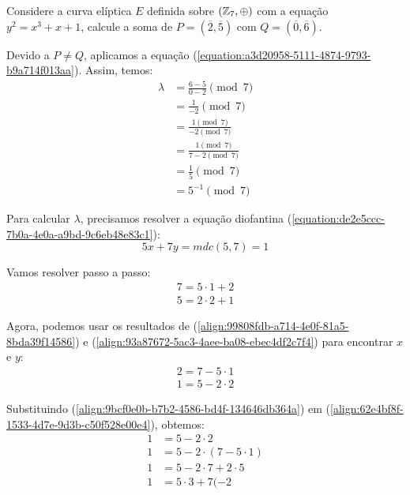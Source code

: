 \begin{exemplo} \label{exemplo:b4a1c70a-c453-4fa1-96dd-06ef10d1fc29}

	Considere a curva elíptica $E$ definida sobre $(\mathbb{Z}_7, \oplus)$ com a equação
	$y^2 = x^3 + x + 1$, calcule a soma de $P = (\overline{2}, \overline{5})$ com
	$Q = (\overline{0}, \overline{6})$.

	Devido a $P \neq Q$, aplicamos a equação
	(\ref{equation:a3d20958-5111-4874-9793-b9a714f013aa}). Assim, temos:
	\begin{align}
		\lambda & = \frac{6 - 5}{0 - 2} \pmod{7} \nonumber                              \\
		        & = \frac{1}{-2} \pmod{7} \nonumber                                     \\
		        & = \frac{1 \pmod{7}}{-2 \pmod{7}} \nonumber                            \\
		        & = \frac{1 \pmod{7}}{7 - 2 \pmod{7}} \nonumber                         \\
		        & = \frac{1}{5} \pmod{7} \nonumber                                      \\
		        & = 5^{-1} \pmod{7}  \label{align:7915667e-0a81-43a7-8195-a96dc204fc57}
	\end{align}

	\justify
	Para calcular $\lambda$, precisamos resolver a equação diofantina (\ref{equation:de2e5ccc-7b0a-4e0a-a9bd-9c6eb48e83c1}):
	\begin{equation}
		5x + 7y = mdc(5, 7) = 1 \nonumber
	\end{equation}

	\justify
	Vamos resolver passo a passo:
	\begin{align}
		7 = 5 \cdot 1 + 2 \label{align:99808fdb-a714-4e0f-81a5-8bda39f14586} \\
		5 = 2 \cdot 2 + 1 \label{align:93a87672-5ac3-4aee-ba08-ebec4df2c7f4}
	\end{align}

	\justify
	Agora, podemos usar os resultados de (\ref{align:99808fdb-a714-4e0f-81a5-8bda39f14586}) e (\ref{align:93a87672-5ac3-4aee-ba08-ebec4df2c7f4}) para encontrar $x$ e $y$:
	\begin{align}
		2 = 7 - 5 \cdot 1 \label{align:9bcf0e0b-b7b2-4586-bd4f-134646db364a} \\
		1 = 5 - 2 \cdot 2 \label{align:62e4bf8f-1533-4d7e-9d3b-c50f528e00e4}
	\end{align}

	\justify
	Substituindo (\ref{align:9bcf0e0b-b7b2-4586-bd4f-134646db364a}) em (\ref{align:62e4bf8f-1533-4d7e-9d3b-c50f528e00e4}), obtemos:
	\begin{align}
		1 & = 5 - 2 \cdot 2   \nonumber             \\
		1 & = 5 - 2 \cdot (7 - 5 \cdot 1) \nonumber \\
		1 & = 5 - 2 \cdot 7 + 2 \cdot 5  \nonumber  \\
		1 & = 5 \cdot 3 + 7 (-2\nonumber
	\end{align}


\end{exemplo}
